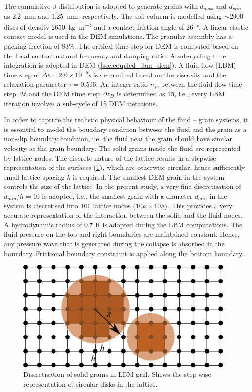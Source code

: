The cumulative $\beta$ distribution is adopted to generate grains with 
$d_{max}$ and $d_{min}$ as 2.2~\si{\mm} and 1.25~\si{\mm}, respectively. The 
soil column is modelled using $\sim 2000$ discs of density 
\SI{2650}{\kg\per\cubic\meter} and a contact friction angle of 
\SI{26}{\degree}. A linear-elastic contact model is used in the
DEM simulations. The granular assembly has a packing fraction of $83\%$. The 
critical time step for DEM is computed based on the local 
contact natural frequency and damping ratio. A sub-cycling time integration is 
adopted in DEM (\cref{sec:coupled_lbm_dem}). A fluid flow (LBM) time step 
of $\Delta t = 2.0\times 10^{-5}$\si{\s} is determined based on the viscosity 
and the relaxation parameter $\tau = 0.506$. An integer ratio $n_s$, between 
the fluid flow time step $\Delta t$ and the DEM time step $\Delta t_D$ is 
determined as 15, i.e., every LBM iteration involves a sub-cycle of 15 DEM 
iterations.

In order to capture the realistic physical behaviour of the fluid – grain 
systems, it is essential to model the boundary condition between the fluid and 
the grain as a non-slip boundary condition, i.e. the fluid near the grain 
should have similar velocity as the grain boundary. The solid grains inside the 
fluid are represented by lattice nodes. The discrete nature of the lattice 
results in a stepwise representation of the surfaces (\cref{fig:LBM-DEM}), 
which are otherwise circular, hence sufficiently small lattice spacing $h$ is 
required. The smallest DEM grain in the system controls the size of the 
lattice. In the present study, a very fine discretisation of $d_{min}/h = 10$ 
is adopted, i.e., the smallest grain with a diameter $d_{min}$ in the system is 
discretised into 100 lattice nodes ($ 10h \times 10h$). This provides a very 
accurate representation of the interaction between the solid and the fluid 
nodes.  A hydrodynamic radius of 0.7 R is adopted during the LBM computations. 
The fluid pressure on the top and right boundaries are maintained constant. 
Hence, any pressure wave that is generated during the collapse is absorbed in 
the boundary. Frictional boundary constraint is applied along the bottom 
boundary.

\begin{figure}[htpb]
\centering
\includegraphics[width=0.97\textwidth]{LBM-DEM}
\caption{Discretisation of solid grains in LBM grid. Shows the step-wise 
representation of circular disks in the lattice.}
\label{fig:LBM-DEM}
\end{figure}


